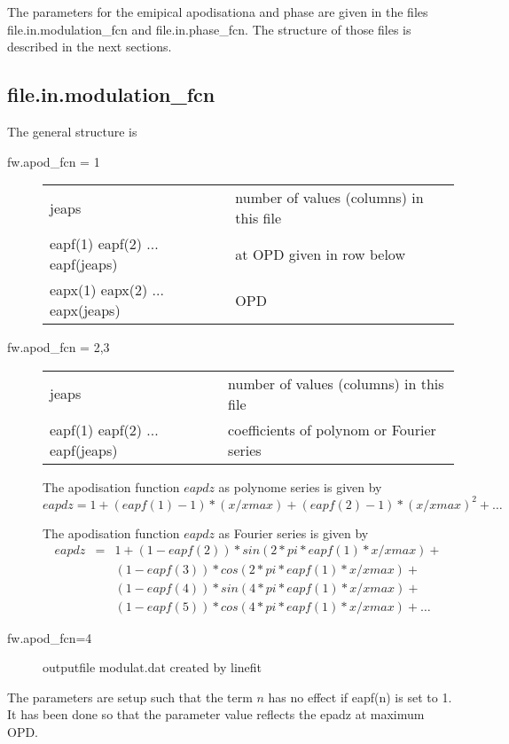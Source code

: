 \documentclass[a4paper]{article}
\begin{document}
The parameters for the emipical apodisationa and phase are given in
the files file.in.modulation\_fcn and file.in.phase\_fcn. The
structure of those files is described in the next sections. 




\subsection{file.in.modulation\_fcn}

The
general structure is 
\begin{description}
\item[fw.apod\_fcn = 1]\hspace{2cm}
  
  \noindent
  \begin{tabular}{ll}  
    jeaps & number of values (columns) in this file\\
    eapf(1) eapf(2) ... eapf(jeaps)& at OPD given in row below\\
    eapx(1) eapx(2) ... eapx(jeaps) & OPD\\
  \end{tabular}
\item[fw.apod\_fcn = 2,3]\hspace{2cm}
  \noindent
  \begin{tabular}{ll}  
    jeaps & number of values (columns) in this file\\
    eapf(1) eapf(2) ... eapf(jeaps)& coefficients of polynom or Fourier series\\
  \end{tabular}

  The apodisation function $eapdz$ as polynome series is given by
\begin{equation}
  eapdz = 1 + (eapf(1)-1)*(x/xmax) + (eapf(2)-1)*(x/xmax)^2 + \ldots
\end{equation}

  The apodisation function $eapdz$ as Fourier series is given by
  \begin{eqnarray}
    eapdz &=& 1 + (1-eapf(2))*sin(2*pi*eapf(1)*x/xmax) +\\
          &&(1-eapf(3))*cos(2*pi*eapf(1)*x/xmax) +\\
          &&(1-eapf(4))*sin(4*pi*eapf(1)*x/xmax) +\\
          &&(1-eapf(5))*cos(4*pi*eapf(1)*x/xmax) +\ldots    
  \end{eqnarray}
\item[fw.apod\_fcn=4] outputfile modulat.dat created by linefit
\end{description}
The parameters are setup such that the term $n$ has no effect if
eapf(n) is set to 1. It has been done so that the parameter value reflects the epadz at maximum OPD.
\end{document}
